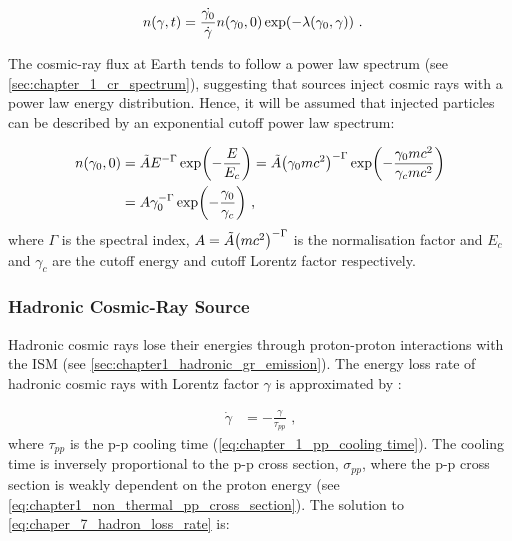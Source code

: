 \begin{equation}
    \begin{aligned}
    n\qty(\gamma,t)&=\frac{\dot{\gamma_0}}{\dot{\gamma}}n\qty(\gamma_0,0)\exp(-\lambda\qty(\gamma_0,\gamma))\text{ .}
    \end{aligned} \label{eq:chapter_7_cr_energy_distribution_imp} 
\end{equation}

The cosmic-ray flux at Earth tends to follow a power law spectrum (see \autoref{sec:chapter_1_cr_spectrum}), suggesting that sources inject cosmic rays with a power law energy distribution. Hence, it will be assumed that injected particles can be described by an exponential cutoff power law spectrum:

\begin{equation}
    \begin{aligned}
    n\qty(\gamma_0,0)&=\tilde{A}E^{-\Gamma}\exp(-\frac{E}{E_c})=\tilde{A}\qty(\gamma_0 mc^2)^{-\Gamma}\exp(-\frac{\gamma_0 mc^2}{\gamma_c mc^2}) \\
	&=A\gamma_0^{-\Gamma}\exp(-\frac{\gamma_0}{\gamma_c})\text{ ,}
    \end{aligned} \label{eq:chapter_7_cr_energy_distribution_imp_t0} 
\end{equation}
\noindent where $\Gamma$ is the spectral index, $A=\tilde{A}\qty(mc^2)^{-\Gamma}$ is the normalisation factor and $E_c$ and $\gamma_c$ are the cutoff energy and cutoff Lorentz factor respectively.

\subsubsection{Hadronic Cosmic-Ray Source}

Hadronic cosmic rays lose their energies through proton-proton interactions with the ISM (see \autoref{sec:chapter1_hadronic_gr_emission}). The energy loss rate of hadronic cosmic rays with Lorentz factor $\gamma$ is approximated by \cite{1996A&A...309..917A}:

\begin{equation}
    \begin{aligned}
    \dot{\gamma}&=-\frac{\gamma}{\tau_{pp}} \text{ ,}
    \end{aligned} \label{eq:chaper_7_hadron_loss_rate}
\end{equation}
\noindent where $\tau_{pp}$ is the p-p cooling time (\autoref{eq:chapter_1_pp_cooling time}). The cooling time is inversely proportional to the p-p cross section, $\sigma_{pp}$, where the p-p cross section is weakly dependent on the proton energy (see \autoref{eq:chapter1_non_thermal_pp_cross_section}). The solution to \autoref{eq:chaper_7_hadron_loss_rate} is:

